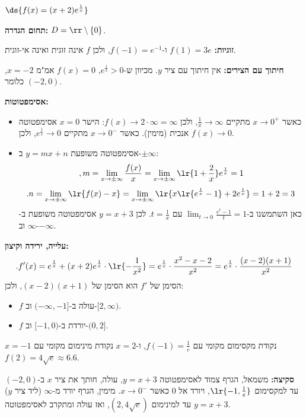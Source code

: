 \item $\ds{f(x) = (x + 2)e^{\frac{1}{x}}}$
\begin{solbox}
\unverified
\textbf{תחום הגדרה:}
$D=\rr\setminus\{0\}$.

\textbf{זוגיות:}
$f(1)=3e$
ו-$f(-1)=e^{-1}$,
ולכן
$f$
אינה זוגית ואינה אי-זוגית.

\textbf{חיתוך עם הצירים:}
אין חיתוך עם ציר
$y$.
מכיוון ש-$e^{\frac1x}>0$,
$f(x)=0$
אמ"מ
$x=-2$,
כלומר
$(-2,0)$.

\textbf{אסימפטוטות:}
\begin{itemize}
\item
כאשר
$x\to0^+$
מתקיים
$\frac1x\to\infty$,
ולכן
$f(x)\to 2\cdot\infty=\infty$:
הישר
$x=0$
אסימפטוטה אנכית (מימין).
כאשר
$x\to0^-$
מתקיים
$e^{\frac1x}\to0$,
ולכן
$f(x)\to0$.
\item
אסימפטוטה משופעת
$y=mx+n$
ב-$\pm\infty$:
$$,m=\lim_{x\to\pm\infty}\frac{f(x)}{x}=\lim_{x\to\pm\infty}\lr{1+\frac2x}e^{\frac1x}=1$$
$$.n=\lim_{x\to\pm\infty}\lr{f(x)-x}=\lim_{x\to\pm\infty}\lr{x\lr{e^{\frac1x}-1}+2e^{\frac1x}}=1+2=3$$
כאן השתמשנו ב-$\lim_{t\to0}\frac{e^t-1}{t}=1$
עם
$t=\frac1x$.
לכן
$y=x+3$
אסימפטוטה משופעת ב-$\infty$
וב-$-\infty$.
\end{itemize}

\textbf{עלייה, ירידה וקיצון:}
$$.f'(x)=e^{\frac1x}+(x+2)e^{\frac1x}\cdot\lr{-\frac{1}{x^2}}=e^{\frac1x}\cdot\frac{x^2-x-2}{x^2}=e^{\frac1x}\cdot\frac{(x-2)(x+1)}{x^2}$$
הסימן של
$f'$
הוא הסימן של
$(x-2)(x+1)$,
ולכן:
\begin{itemize}
\item
$f$
עולה ב-$(-\infty,-1]$
וב-$[2,\infty)$.
\item
$f$
יורדת ב-$[-1,0)$
וב-$(0,2]$.
\end{itemize}
$x=-1$
נקודת מקסימום מקומי עם
$f(-1)=\frac1e$,
ו-$x=2$
נקודת מינימום מקומי עם
$f(2)=4\sqrt{e}\approx6.6$.

\textbf{סקיצה:}
משמאל, הגרף צמוד לאסימפטוטה
$y=x+3$,
עולה, חותך את ציר
$x$
ב-$(-2,0)$
עד למקסימום
$\lr{-1,\frac1e}$,
ויורד אל
$0$
כאשר
$x\to0^-$.
מימין, הגרף יורד מ-$\infty$ (ליד ציר
$y$)
עד למינימום
$(2,4\sqrt e)$,
ואז עולה ומתקרב לאסימפטוטה
$y=x+3$.
\end{solbox}
\eMs
\eE
